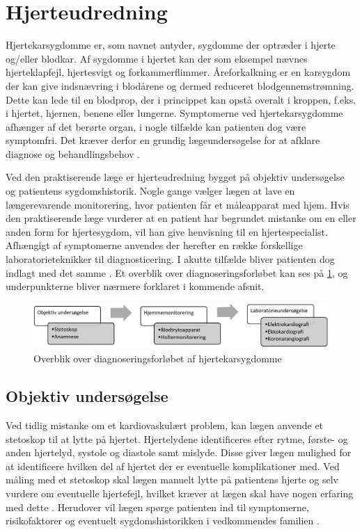 \section{Hjerteudredning}
Hjertekarsygdomme er, som navnet antyder, sygdomme der optræder i hjerte og/eller blodkar. Af sygdomme i hjertet kan der som eksempel nævnes hjerteklapfejl, hjertesvigt og forkammerflimmer. Åreforkalkning er en karsygdom der kan give indsnævring i blodårene og dermed reduceret blodgennemstrømning. Dette kan lede til en blodprop, der i princippet kan opstå overalt i kroppen, f.eks. i hjertet, hjernen, benene eller lungerne. Symptomerne ved hjertekarsygdomme afhænger af det berørte organ, i nogle tilfælde kan patienten dog være symptomfri. Det kræver derfor en grundig lægeundersøgelse for at afklare diagnose og behandlingsbehov \cite{apoteket}. 

Ved den praktiserende læge er hjerteudredning bygget på objektiv undersøgelse og patientens sygdomshistorik. Nogle gange vælger lægen at lave en længerevarende monitorering, hvor patienten får et måleapparat med hjem. Hvis den praktiserende læge vurderer at en patient har begrundet mistanke om en eller anden form for hjertesygdom, vil han give henvisning til en hjertespecialist. Afhængigt af symptomerne anvendes der herefter en række forskellige laboratorieteknikker til diagnosticering. I akutte tilfælde bliver patienten dog indlagt med det samme \cite{hjerud}. Et overblik over diagnoseringsforløbet kan ses på \ref{fig:forloeb}, og underpunkterne bliver nærmere forklaret i kommende afsnit.

\begin{figure}[H] %
\begin{center}
\includegraphics[width=1\textwidth]{figures/forloeb}
\end{center}
\caption{Overblik over diagnoseringsforløbet af hjertekarsygdomme}
\label{fig:forloeb}
\end{figure}

\subsection{Objektiv undersøgelse}
Ved tidlig mistanke om et kardiovaskulært problem, kan lægen anvende et stetoskop til at lytte på hjertet. Hjertelydene identificeres efter rytme, første- og anden hjertelyd, systole og diastole samt mislyde. Disse giver lægen mulighed for at identificere hvilken del af hjertet der er eventuelle komplikationer med. Ved måling med et stetoskop skal lægen manuelt lytte på patientens hjerte og selv vurdere om eventuelle hjertefejl, hvilket kræver at lægen skal have nogen erfaring med dette \cite{subob}. Herudover vil lægen spørge patienten ind til symptomerne, risikofaktorer og eventuelt sygdomshistorikken i vedkommendes familien \cite{hjerud}. 
 
